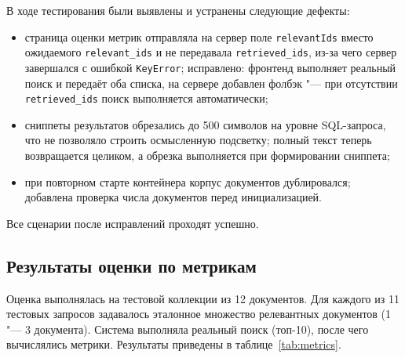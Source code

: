 В ходе тестирования были выявлены и устранены следующие дефекты:

\begin{itemize}
	\item страница оценки метрик отправляла на сервер поле \texttt{relevantIds} вместо ожидаемого \texttt{relevant\_ids} и не передавала \texttt{retrieved\_ids}, из-за чего сервер завершался с ошибкой \texttt{KeyError}; исправлено: фронтенд выполняет реальный поиск и передаёт оба списка, на сервере добавлен фолбэк "--- при отсутствии \texttt{retrieved\_ids} поиск выполняется автоматически;
	\item сниппеты результатов обрезались до 500 символов на уровне SQL-запроса, что не позволяло строить осмысленную подсветку; полный текст теперь возвращается целиком, а обрезка выполняется при формировании сниппета;
	\item при повторном старте контейнера корпус документов дублировался; добавлена проверка числа документов перед инициализацией.
\end{itemize}

Все сценарии после исправлений проходят успешно.

\subsection{Результаты оценки по метрикам}

Оценка выполнялась на тестовой коллекции из 12 документов. Для каждого из 11 тестовых
запросов задавалось эталонное множество релевантных документов (1 "--- 3 документа).
Система выполняла реальный поиск (топ-10), после чего вычислялись метрики. Результаты
приведены в таблице~\ref{tab:metrics}.


